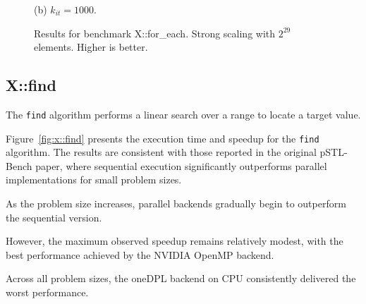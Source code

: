 \documentclass[sigconf]{acmart}
\begin{document}
\begin{figure}[H]
\begin{minipage}[t]{0.48\linewidth}
            \caption*{(b) $k_{it} = 1000$.}
      \end{minipage}
      \caption{Results for benchmark X::for\_each. Strong scaling with $2^{29}$
            elements. Higher is better.}\label{fig:speedup_threads-for_each}
\end{figure}

\subsection{X::find}
The \texttt{find} algorithm performs a linear search over a range to locate a
target value.

Figure~\ref{fig:x::find} presents the execution time and speedup for the
\texttt{find} algorithm. The results are consistent with those reported in the
original pSTL-Bench paper, where sequential execution significantly outperforms
parallel implementations for small problem sizes.

As the problem size increases, parallel backends gradually begin to outperform
the sequential version.

However, the maximum observed speedup remains relatively modest, with the best
performance achieved by the NVIDIA OpenMP backend.

Across all problem sizes, the oneDPL backend on CPU consistently delivered the
worst performance.
\end{document}
